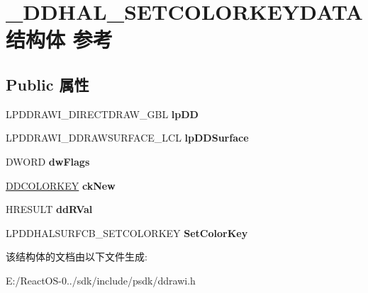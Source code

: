 \hypertarget{struct___d_d_h_a_l___s_e_t_c_o_l_o_r_k_e_y_d_a_t_a}{}\section{\+\_\+\+D\+D\+H\+A\+L\+\_\+\+S\+E\+T\+C\+O\+L\+O\+R\+K\+E\+Y\+D\+A\+T\+A结构体 参考}
\label{struct___d_d_h_a_l___s_e_t_c_o_l_o_r_k_e_y_d_a_t_a}
\subsection*{Public 属性}
\begin{DoxyCompactItemize}
\item 
\mbox{\label{struct___d_d_h_a_l___s_e_t_c_o_l_o_r_k_e_y_d_a_t_a_ad5162a5ea71f4cfb59e8be3ac51493fd}} 
L\+P\+D\+D\+R\+A\+W\+I\+\_\+\+D\+I\+R\+E\+C\+T\+D\+R\+A\+W\+\_\+\+G\+BL {\bfseries lp\+DD}
\item 
\mbox{\label{struct___d_d_h_a_l___s_e_t_c_o_l_o_r_k_e_y_d_a_t_a_a03f4c6fbe1902cbb44f4b43b407a976f}} 
L\+P\+D\+D\+R\+A\+W\+I\+\_\+\+D\+D\+R\+A\+W\+S\+U\+R\+F\+A\+C\+E\+\_\+\+L\+CL {\bfseries lp\+D\+D\+Surface}
\item 
\mbox{\label{struct___d_d_h_a_l___s_e_t_c_o_l_o_r_k_e_y_d_a_t_a_a942d0d7d624fc20c4113430440e9b4cb}} 
D\+W\+O\+RD {\bfseries dw\+Flags}
\item 
\mbox{\label{struct___d_d_h_a_l___s_e_t_c_o_l_o_r_k_e_y_d_a_t_a_ae6f1a465fa2fdb7c838ba60b3c539b2f}} 
\hyperlink{struct_d_d_c_o_l_o_r_k_e_y}{D\+D\+C\+O\+L\+O\+R\+K\+EY} {\bfseries ck\+New}
\item 
\mbox{\label{struct___d_d_h_a_l___s_e_t_c_o_l_o_r_k_e_y_d_a_t_a_a4304c2a457607888d436431f44fdcc55}} 
H\+R\+E\+S\+U\+LT {\bfseries dd\+R\+Val}
\item 
\mbox{\label{struct___d_d_h_a_l___s_e_t_c_o_l_o_r_k_e_y_d_a_t_a_ab8304a13a3011b95f462dde46442adfd}} 
L\+P\+D\+D\+H\+A\+L\+S\+U\+R\+F\+C\+B\+\_\+\+S\+E\+T\+C\+O\+L\+O\+R\+K\+EY {\bfseries Set\+Color\+Key}
\end{DoxyCompactItemize}


该结构体的文档由以下文件生成\+:\begin{DoxyCompactItemize}
\item 
E\+:/\+React\+O\+S-\/0../sdk/include/psdk/ddrawi.\+h\end{DoxyCompactItemize}
